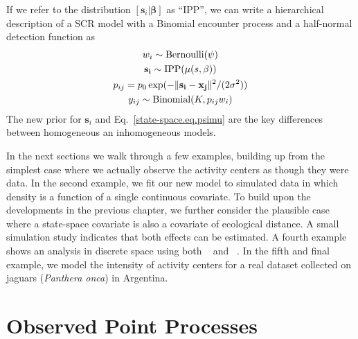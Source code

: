 If we refer to the distribution $[\mathbf{s}_i | \bm{\beta}]$ as
``IPP'', we can write a hierarchical description of a SCR model with a
Binomial encounter process and a half-normal detection function as
\begin{gather*}
w_i \sim \mbox{Bernoulli}(\psi) \\
{\bf s_i} \sim \mbox{IPP}(\mu(s,\beta)) \\
p_{ij} = p_0 \exp(-\|{\bf s_i} - {\bf x_{j}}\|^2/(2\sigma^2)) \\
y_{ij} \sim \mbox{Binomial}(K, p_{ij} w_i)
\end{gather*}
The new prior for $\mathbf{s}_i$ and Eq.~\ref{state-space.eq.psimu}
are the key differences between homogeneous an inhomogeneous
models. %

In the next sections we walk through a few examples, building up from
the simplest case where we actually observe the activity centers as
though they were data. In the second example, we fit our new model to simulated
data in which density is a function of a single continuous
covariate. To build upon the developments in the previous chapter, we
further consider the plausible case where a state-space covariate is also a
covariate of ecological distance. A small simulation study indicates
that both effects can be estimated. A fourth example shows an analysis in discrete space using
both \secr~\citep{efford:2011} and \jags~\citep{plummer:2003}. In the
fifth and final example, we model the intensity of
activity centers for a real dataset collected on jaguars
(\emph{Panthera onca}) in Argentina.

\section{Observed Point Processes}


